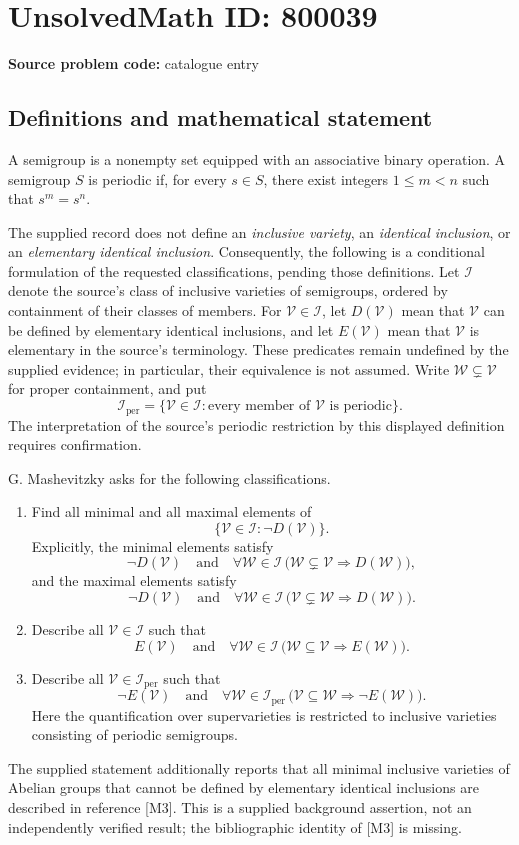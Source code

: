 \documentclass[11pt]{article}
\begin{document}
\section*{UnsolvedMath ID: 800039}
\textbf{Source problem code:} catalogue entry
\subsection{Definitions and mathematical statement}
A semigroup is a nonempty set equipped with an associative binary operation. A semigroup \(S\) is periodic if, for every \(s\in S\), there exist integers \(1\leq m<n\) such that \(s^m=s^n\).

The supplied record does not define an \emph{inclusive variety}, an \emph{identical inclusion}, or an \emph{elementary identical inclusion}. Consequently, the following is a conditional formulation of the requested classifications, pending those definitions. Let \(\mathcal I\) denote the source's class of inclusive varieties of semigroups, ordered by containment of their classes of members. For \(\mathcal V\in\mathcal I\), let \(D(\mathcal V)\) mean that \(\mathcal V\) can be defined by elementary identical inclusions, and let \(E(\mathcal V)\) mean that \(\mathcal V\) is elementary in the source's terminology. These predicates remain undefined by the supplied evidence; in particular, their equivalence is not assumed. Write \(\mathcal W\subsetneq\mathcal V\) for proper containment, and put
\[
\mathcal I_{\mathrm{per}}=\{\mathcal V\in\mathcal I: \text{every member of }\mathcal V\text{ is periodic}\}.
\]
The interpretation of the source's periodic restriction by this displayed definition requires confirmation.

G. Mashevitzky asks for the following classifications.
\begin{enumerate}
\item Find all minimal and all maximal elements of
\[
\{\mathcal V\in\mathcal I:\neg D(\mathcal V)\}.
\]
Explicitly, the minimal elements satisfy
\[
\neg D(\mathcal V)\quad\text{and}\quad
\forall\mathcal W\in\mathcal I\,
\bigl(\mathcal W\subsetneq\mathcal V\Longrightarrow D(\mathcal W)\bigr),
\]
and the maximal elements satisfy
\[
\neg D(\mathcal V)\quad\text{and}\quad
\forall\mathcal W\in\mathcal I\,
\bigl(\mathcal V\subsetneq\mathcal W\Longrightarrow D(\mathcal W)\bigr).
\]
\item Describe all \(\mathcal V\in\mathcal I\) such that
\[
E(\mathcal V)\quad\text{and}\quad
\forall\mathcal W\in\mathcal I\,
\bigl(\mathcal W\subseteq\mathcal V\Longrightarrow E(\mathcal W)\bigr).
\]
\item Describe all \(\mathcal V\in\mathcal I_{\mathrm{per}}\) such that
\[
\neg E(\mathcal V)\quad\text{and}\quad
\forall\mathcal W\in\mathcal I_{\mathrm{per}}\,
\bigl(\mathcal V\subseteq\mathcal W\Longrightarrow\neg E(\mathcal W)\bigr).
\]
Here the quantification over supervarieties is restricted to inclusive varieties consisting of periodic semigroups.
\end{enumerate}
The supplied statement additionally reports that all minimal inclusive varieties of Abelian groups that cannot be defined by elementary identical inclusions are described in reference [M3]. This is a supplied background assertion, not an independently verified result; the bibliographic identity of [M3] is missing.
\end{document}
